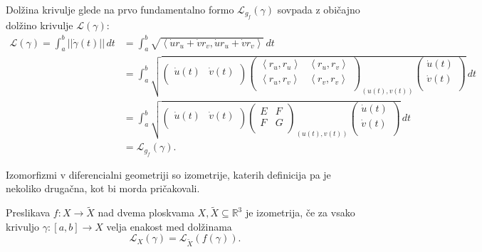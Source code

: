 \begin{opomba}
 Dolžina krivulje glede na prvo fundamentalno
 formo $\mathcal{L}_{g_f}(\gamma)$ sovpada z običajno dolžino krivulje $\mathcal{L}(\gamma)$: \begin{align*}
    \mathcal{L}(\gamma)  = \int_{a}^{b} \lvert\lvert \dot{\gamma}(t) \rvert\rvert  \, dt  &=
	 \int_{a}^{b} \sqrt{\left<\dot{u}r_u + \dot{v}r_v, \dot{u}r_u + \dot{v}r_v \right> }  \, dt \\
        &= \int_{a}^{b} \sqrt{ 
\begin{pmatrix}
	\dot{u}(t) & \dot{v}(t) \\
\end{pmatrix}
\begin{pmatrix}
	\left<r_u, r_u \right> & \left<r_u, r_v \right>  \\
	\left< r_u, r_v \right>	  & \left<r_v, r_v \right> \\
\end{pmatrix}_{(u(t), v(t))}
\begin{pmatrix}
	\dot{u}(t) \\
	\dot{v}(t) \\
\end{pmatrix}
}  \, dt  \\
 &=  \int_{a}^{b} \sqrt{ 
\begin{pmatrix}
	\dot{u}(t) & \dot{v}(t) \\
\end{pmatrix}
\begin{pmatrix}
	E & F \\
	F & G \\
\end{pmatrix}_{(u(t), v(t))}
\begin{pmatrix}
	\dot{u}(t) \\
	\dot{v}(t) \\
\end{pmatrix}
}  \, dt  \\
&= \mathcal{L}_{g_f}(\gamma).
 \end{align*}
\end{opomba}

Izomorfizmi v diferencialni geometriji so izometrije, katerih
definicija pa je nekoliko drugačna, kot bi morda pričakovali.

\begin{definicija}
\label{def_izometrija}
 Preslikava $f: X \to \tilde{X}$ nad dvema ploskvama $X, \tilde{X} \subseteq
 \mathbb{R}^3$ je izometrija, če za vsako krivuljo $\gamma: \left[ a,b
 \right] \to  X$ velja enakost med dolžinama 
 \begin{equation*} \mathcal{L}_X(\gamma) = \mathcal{L}_{\tilde{X}}(f(\gamma)). \end{equation*}
\end{definicija}

